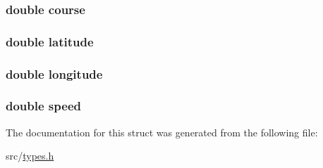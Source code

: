 \subsubsection[{\texorpdfstring{course}{course}}]{\setlength{\rightskip}{0pt plus 5cm}double course}\hypertarget{struct_g_p_s_samp_acaa2fde7e3fad7df8f5755347603d17b}{}\label{struct_g_p_s_samp_acaa2fde7e3fad7df8f5755347603d17b}
\subsubsection[{\texorpdfstring{latitude}{latitude}}]{\setlength{\rightskip}{0pt plus 5cm}double latitude}\hypertarget{struct_g_p_s_samp_a76714bdbc5c536fa77dfb14533ff82a9}{}\label{struct_g_p_s_samp_a76714bdbc5c536fa77dfb14533ff82a9}
\subsubsection[{\texorpdfstring{longitude}{longitude}}]{\setlength{\rightskip}{0pt plus 5cm}double longitude}\hypertarget{struct_g_p_s_samp_ac155e35fdeebafc89723a51520fb9fe6}{}\label{struct_g_p_s_samp_ac155e35fdeebafc89723a51520fb9fe6}
\subsubsection[{\texorpdfstring{speed}{speed}}]{\setlength{\rightskip}{0pt plus 5cm}double speed}\hypertarget{struct_g_p_s_samp_a6dc6e6f3c75c509ce943163afb5dade7}{}\label{struct_g_p_s_samp_a6dc6e6f3c75c509ce943163afb5dade7}


The documentation for this struct was generated from the following file\+:\begin{DoxyCompactItemize}
\item 
src/\hyperlink{types_8h}{types.\+h}\end{DoxyCompactItemize}
